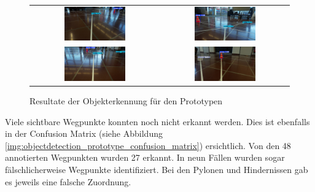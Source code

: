 \documentclass[../main.tex]{subfiles}
\begin{document}
\begin{figure}[H]
\begin{center}
\begin{tabular}{cc}
    \includegraphics[width=0.5\textwidth]{img/prototyping/objekterkennung/Bild1_Prediction.jpg} &
    \includegraphics[width=0.5\textwidth]{img/prototyping/objekterkennung/Bild2_Prediction.jpg} \\
    \includegraphics[width=0.5\textwidth]{img/prototyping/objekterkennung/Bild3_Prediction.jpg} &
    \includegraphics[width=0.5\textwidth]{img/prototyping/objekterkennung/Bild4_Prediction.jpg}
\end{tabular}
\caption{Resultate der Objekterkennung für den Prototypen}
\label{img:objectdetection_prototype_results}
\end{center}
\end{figure}

Viele sichtbare Wegpunkte konnten noch nicht erkannt werden. Dies ist ebenfalls in der Confusion Matrix (siehe Abbildung \ref{img:objectdetection_prototype_confusion_matrix}) ersichtlich.  
Von den 48 annotierten Wegpunkten wurden 27 erkannt. In neun Fällen wurden sogar fälschlicherweise Wegpunkte identifiziert. Bei den Pylonen und Hindernissen gab es jeweils eine falsche Zuordnung.
\end{document}
